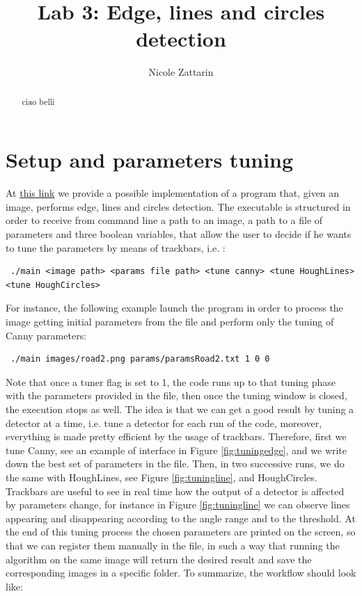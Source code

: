 \documentclass[twoside,onecolumn]{article}
\title{Lab 3: Edge, lines and circles detection } %
\author{Nicole Zattarin}
\date{}
\theoremstyle{definition}
\begin{document}
\maketitle

\begin{abstract}
ciao belli
\end{abstract}
\section{Setup and parameters tuning}


At \href{https://github.com/nicolezattarin/Computer-Vision/tree/main/edge_detection}{this link} we provide a possible implementation of a program that, given an image, performs edge, lines and circles detection. The executable is structured in order to receive from command line a path to an image, a path to a file of parameters and three boolean variables, that allow the user to decide if he wants to tune the parameters by means of trackbars, i.e. :
\begin{verbatim}
 ./main <image path> <params file path> <tune canny> <tune HoughLines> <tune HoughCircles>
\end{verbatim}
For instance, the following example launch the program in order to process the image  getting initial parameters from the file  and perform only the tuning of Canny parameters:
\begin{verbatim}
 ./main images/road2.png params/paramsRoad2.txt 1 0 0 
\end{verbatim}
Note that once a tuner flag is set to 1, the code runs up to that tuning phase with the parameters provided in the file, then once the tuning window is closed, the execution stops as well.
The idea is that we can get a good result by tuning a detector at a time, i.e. tune a detector for each run of the code, moreover, everything is made pretty efficient by the usage of trackbars. Therefore, first we tune Canny, see an example of interface in Figure \ref{fig:tuningedge}, and we write down the best set of parameters in the  file. Then, in two successive runs, we do the same with HoughLines, see Figure \ref{fig:tuningline}, and HoughCircles. Trackbars are useful to see in real time how the output of a detector is affected by parameters change, for instance in Figure \ref{fig:tuningline} we can observe lines appearing and disappearing according to the angle range and to the threshold. At the end of this tuning process the chosen parameters are printed on the screen, so that we can register them manually in the  file, in such a way that running the algorithm on the same image will return the desired result and save the corresponding images in a specific folder. To summarize, the workflow should look like:
\end{document}
